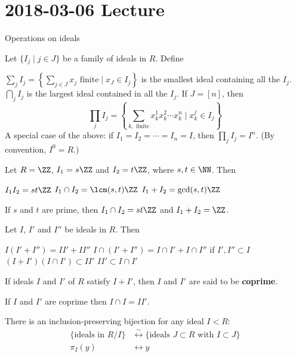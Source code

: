 \section{2018-03-06 Lecture}

Operations on ideals

\begin{defn}
	Let $\{I_j \mid j \in J\}$ be a family of ideals in $R$.
	Define
	\begin{itm}
		\io $\sum_j I_j = \left\{ \sum_{j \in J} x_j \text{ finite} \mid x_J \in I_j \right\}$ is the smallest ideal containing all the $I_j$.
		\io $\bigcap_j I_j$ is the largest ideal contained in all the $I_j$.
		\io If $J = [n]$, then
		\[\prod_j I_j = \left\{ \sum_{k,\text{ finite}} x_k^1 x_k^2 \cdots x_k^n \mid x_k^j \in I_j\right\}\]
		\io A special case of the above: if $I_1=I_2=\cdots=I_n=I$, then $\prod_j I_j = I^n$.
		(By convention, $I^0=R$.)
	\end{itm}
\end{defn}

\begin{exam}
	Let $R=\ZZ$, $I_1 = s\ZZ$ and $I_2 = t\ZZ$, where $s,t \in \NN$.
	Then
	\begin{itm}
		\io $I_1 I_2 = st\ZZ$
		\io $I_1 \cap I_2 = \lcm(s,t)\ZZ$
		\io $I_1+I_2 = \gcd(s,t)\ZZ$
	\end{itm}
	If $s$ and $t$ are prime, then $I_1 \cap I_2 = st\ZZ$ and $I_1+I_2=\ZZ$.
\end{exam}

\begin{prop}
	Let $I$, $I'$ and $I''$ be ideals in $R$.
	Then
	\begin{itm}
		\io $I(I'+I'') = II'+II''$
		\io $I \cap (I'+I'') = I \cap I' + I \cap I''$ if $I',I'' \subset I$
		\io $(I+I')(I \cap I') \subset II'$
		\io $II' \subset I \cap I'$
	\end{itm}
\end{prop}

\begin{defn}
	If ideals $I$ and $I'$ of $R$ satisfy $I+I'$, then $I$ and $I'$ are said to be \textbf{coprime}.
\end{defn}

\begin{prop}
	If $I$ and $I'$ are coprime then $I \cap I = II'$.
\end{prop}

\begin{prop}
	There is an inclusion-preserving bijection for any ideal $I<R$:
	\begin{align*}
		\{\text{ideals in } R/I\} &\overset{\sim}{\longleftrightarrow} \{\text{ideals } J \subset R \text{ with } I \subset J\} \\
		\pi_I(y) &\longleftrightarrow y
	\end{align*}
\end{prop}

